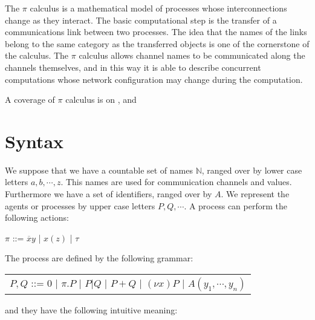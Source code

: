 
The $\pi$ calculus is a mathematical model of processes whose interconnections change as they interact. The basic computational step is the transfer of a communications link between two processes. The idea that the names of the links belong to the same category as the transferred objects is one of the cornerstone of the calculus. The $\pi$ calculus allows channel names to be communicated along the channels themselves, and in this way it is able to describe concurrent computations whose network configuration may change during the computation.

A coverage of $\pi$ calculus is on \cite{parrow}, \cite{sangiorgiwalker} and \cite{milner}

\section{Syntax}
We suppose that we have a countable set of names $\mathbb{N}$, ranged over by lower case letters $a,b, \cdots, z$. This names are used for communication channels and values. Furthermore we have a set of identifiers, ranged over by $A$. We represent the agents or processes by upper case letters $P,Q, \cdots $. A process can perform the following actions:
\begin{center}
  $\pi$ ::= $\overline{x}y$ | $x(z)$ | $\tau$ 
\end{center}
The process are defined by the following grammar:
\begin{center}
  \begin{tabular}{l}
    $P,Q$ ::= $0$ | $\pi.P$ | $P|Q$ | $P+Q$ | $(\nu x) P$ | $A(y_{1}, \cdots, y_{n})$ 
  \end{tabular}
\end{center}
and they have the following intuitive meaning:
